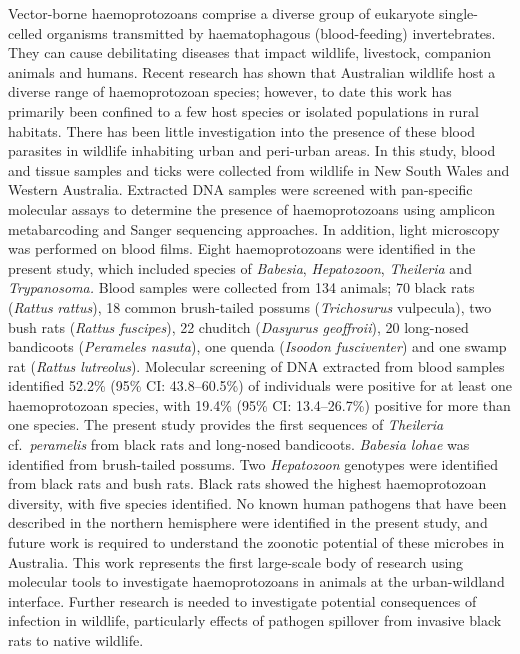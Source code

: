 \documentclass[a4paper, nobind]{templates/ociamthesis}
\begin{document}
Vector-borne haemoprotozoans comprise a diverse group of eukaryote single-celled organisms transmitted by haematophagous (blood-feeding) invertebrates.
They can cause debilitating diseases that impact wildlife, livestock, companion animals and humans.
Recent research has shown that Australian wildlife host a diverse range of haemoprotozoan species; however, to date this work has primarily been confined to a few host species or isolated populations in rural habitats.
There has been little investigation into the presence of these blood parasites in wildlife inhabiting urban and peri-urban areas.
In this study, blood and tissue samples and ticks were collected from wildlife in New South Wales and Western Australia.
Extracted DNA samples were screened with pan-specific molecular assays to determine the presence of haemoprotozoans using amplicon metabarcoding and Sanger sequencing approaches. In addition, light microscopy was performed on blood films.
Eight haemoprotozoans were identified in the present study, which included species of \emph{Babesia}, \emph{Hepatozoon}, \emph{Theileria} and \emph{Trypanosoma.} Blood samples were collected from 134 animals; 70 black rats (\emph{Rattus} \emph{rattus}), 18 common brush-tailed possums (\emph{Trichosurus} vulpecula), two bush rats (\emph{Rattus fuscipes}), 22 chuditch (\emph{Dasyurus geoffroii}), 20 long-nosed bandicoots (\emph{Perameles nasuta}), one quenda (\emph{Isoodon fusciventer}) and one swamp rat (\emph{Rattus lutreolus}).
Molecular screening of DNA extracted from blood samples identified 52.2\% (95\% CI: 43.8--60.5\%) of individuals were positive for at least one haemoprotozoan species, with 19.4\% (95\% CI: 13.4--26.7\%) positive for more than one species.
The present study provides the first sequences of \emph{Theileria} cf.~\emph{peramelis} from black rats and long-nosed bandicoots.
\emph{Babesia lohae} was identified from brush-tailed possums.
Two \emph{Hepatozoon} genotypes were identified from black rats and bush rats. Black rats showed the highest haemoprotozoan diversity, with five species identified.
No known human pathogens that have been described in the northern hemisphere were identified in the present study, and future work is required to understand the zoonotic potential of these microbes in Australia.
This work represents the first large-scale body of research using molecular tools to investigate haemoprotozoans in animals at the urban-wildland interface.
Further research is needed to investigate potential consequences of infection in wildlife, particularly effects of pathogen spillover from invasive black rats to native wildlife.
\end{document}
